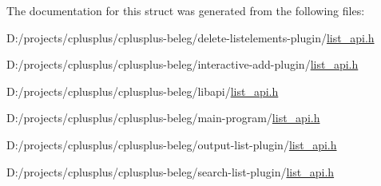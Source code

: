 The documentation for this struct was generated from the following files\-:\begin{DoxyCompactItemize}
\item 
D\-:/projects/cplusplus/cplusplus-\/beleg/delete-\/listelements-\/plugin/\hyperlink{delete-listelements-plugin_2list__api_8h}{list\-\_\-api.\-h}\item 
D\-:/projects/cplusplus/cplusplus-\/beleg/interactive-\/add-\/plugin/\hyperlink{interactive-add-plugin_2list__api_8h}{list\-\_\-api.\-h}\item 
D\-:/projects/cplusplus/cplusplus-\/beleg/libapi/\hyperlink{libapi_2list__api_8h}{list\-\_\-api.\-h}\item 
D\-:/projects/cplusplus/cplusplus-\/beleg/main-\/program/\hyperlink{main-program_2list__api_8h}{list\-\_\-api.\-h}\item 
D\-:/projects/cplusplus/cplusplus-\/beleg/output-\/list-\/plugin/\hyperlink{output-list-plugin_2list__api_8h}{list\-\_\-api.\-h}\item 
D\-:/projects/cplusplus/cplusplus-\/beleg/search-\/list-\/plugin/\hyperlink{search-list-plugin_2list__api_8h}{list\-\_\-api.\-h}\end{DoxyCompactItemize}
